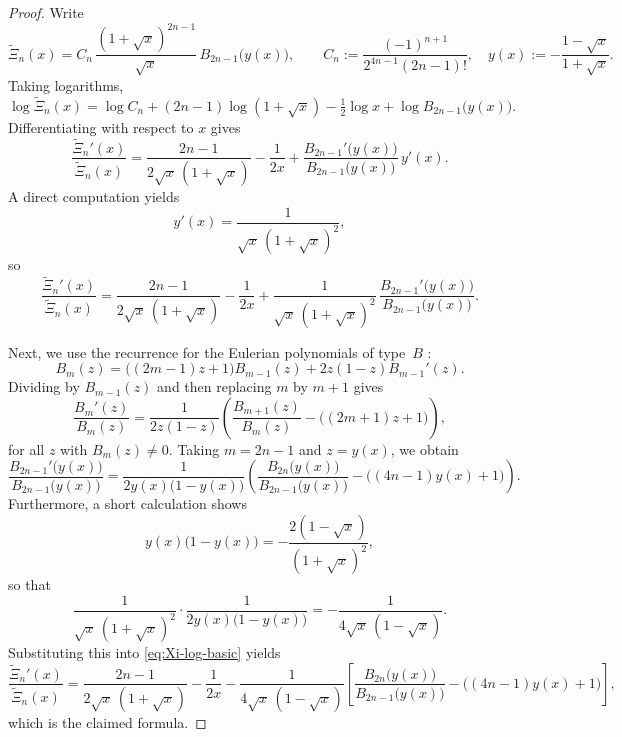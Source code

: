 \documentclass[12pt,twoside]{article}
\newtheorem{lemma}[theorem]{Lemma}
\begin{document}

\begin{proof}
Write
\[
\widetilde{\Xi}_n(x)
=C_n\,
\frac{(1+\sqrt{x})^{2n-1}}{\sqrt{x}}\,
B_{2n-1}\!\bigl(y(x)\bigr),
\qquad
C_n:=\frac{(-1)^{n+1}}{2^{4n-1}(2n-1)!},
\quad
y(x):=-\frac{1-\sqrt{x}}{1+\sqrt{x}}.
\]
Taking logarithms,
\[
\log \widetilde{\Xi}_n(x)
= \log C_n
+ (2n-1)\log(1+\sqrt{x})
-\tfrac12\log x
+ \log B_{2n-1}\!\bigl(y(x)\bigr).
\]
Differentiating with respect to $x$ gives
\[
\frac{\widetilde{\Xi}_n'(x)}{\widetilde{\Xi}_n(x)}
=
\frac{2n-1}{2\sqrt{x}\,(1+\sqrt{x})}
-\frac{1}{2x}
+\frac{B_{2n-1}'\!\bigl(y(x)\bigr)}{B_{2n-1}\!\bigl(y(x)\bigr)}\,y'(x).
\]
A direct computation yields
\[
y'(x)=\frac{1}{\sqrt{x}\,(1+\sqrt{x})^{2}},
\]
so
\begin{equation}\label{eq:Xi-log-basic}
\frac{\widetilde{\Xi}_n'(x)}{\widetilde{\Xi}_n(x)}
=
\frac{2n-1}{2\sqrt{x}\,(1+\sqrt{x})}
-\frac{1}{2x}
+\frac{1}{\sqrt{x}\,(1+\sqrt{x})^{2}}\,
\frac{B_{2n-1}'\!\bigl(y(x)\bigr)}{B_{2n-1}\!\bigl(y(x)\bigr)}.
\end{equation}

Next, we use the recurrence for the Eulerian polynomials of type~$B$\cite[Theorem 4.1]{ChenTangZhao2009} \cite[Theorem 3.4]{Brenti1994}:
\[
B_m(z)
=
\bigl((2m-1)z+1\bigr)B_{m-1}(z)
+2z(1-z)B_{m-1}'(z).
\]
Dividing by $B_{m-1}(z)$ and then replacing $m$ by $m+1$ gives
\[
\frac{B_m'(z)}{B_m(z)}
=
\frac{1}{2z(1-z)}
\left(
  \frac{B_{m+1}(z)}{B_m(z)}
  -\bigl((2m+1)z+1\bigr)
\right),
\]
for all $z$ with $B_m(z)\neq0$.  
Taking $m=2n-1$ and $z=y(x)$, we obtain
\[
\frac{B_{2n-1}'\!\bigl(y(x)\bigr)}{B_{2n-1}\!\bigl(y(x)\bigr)}
=
\frac{1}{2y(x)\bigl(1-y(x)\bigr)}
\left(
  \frac{B_{2n}\!\bigl(y(x)\bigr)}{B_{2n-1}\!\bigl(y(x)\bigr)}
  -\bigl((4n-1)y(x)+1\bigr)
\right).
\]
Furthermore, a short calculation shows
\[
y(x)\bigl(1-y(x)\bigr)
=
-\frac{2(1-\sqrt{x})}{(1+\sqrt{x})^{2}},
\]
so that
\[
\frac{1}{\sqrt{x}\,(1+\sqrt{x})^{2}}\cdot
\frac{1}{2y(x)\bigl(1-y(x)\bigr)}
=
-\frac{1}{4\sqrt{x}\,(1-\sqrt{x})}.
\]
Substituting this into \eqref{eq:Xi-log-basic} yields
\[
\frac{\widetilde{\Xi}_n'(x)}{\widetilde{\Xi}_n(x)}
=
\frac{2n-1}{2\sqrt{x}\,(1+\sqrt{x})}
-\frac{1}{2x}
-\frac{1}{4\sqrt{x}\,(1-\sqrt{x})}
\left[
  \frac{B_{2n}\!\bigl(y(x)\bigr)}{B_{2n-1}\!\bigl(y(x)\bigr)}
  -\bigl((4n-1)y(x)+1\bigr)
\right],
\]
which is the claimed formula.
\end{proof}
\end{document}
